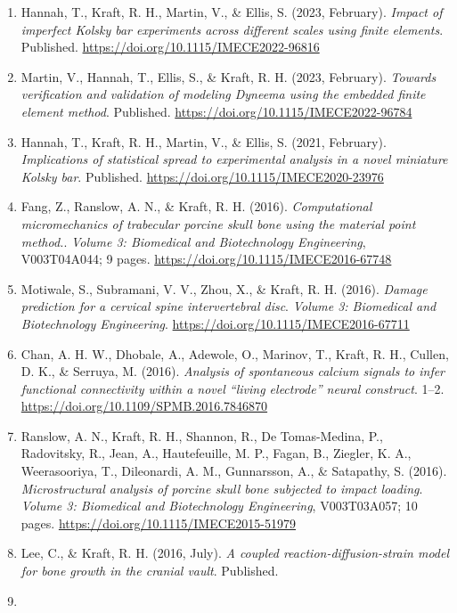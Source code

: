 \documentclass[
]{article}
\begin{document}
\begin{enumerate}
\def\labelenumi{\arabic{enumi}.}
\item
  Hannah, T., Kraft, R. H., Martin, V., \& Ellis, S. (2023, February).
  \emph{Impact of imperfect Kolsky bar experiments across different
  scales using finite elements}. Published.
  \url{https://doi.org/10.1115/IMECE2022-96816}
\item
  Martin, V., Hannah, T., Ellis, S., \& Kraft, R. H. (2023, February).
  \emph{Towards verification and validation of modeling Dyneema using
  the embedded finite element method}. Published.
  \url{https://doi.org/10.1115/IMECE2022-96784}
\item
  Hannah, T., Kraft, R. H., Martin, V., \& Ellis, S. (2021, February).
  \emph{Implications of statistical spread to experimental analysis in a
  novel miniature Kolsky bar}. Published.
  \url{https://doi.org/10.1115/IMECE2020-23976}
\item
  Fang, Z., Ranslow, A. N., \& Kraft, R. H. (2016). \emph{Computational
  micromechanics of trabecular porcine skull bone using the material
  point method.}. \emph{Volume 3: Biomedical and Biotechnology
  Engineering}, V003T04A044; 9 pages.
  \url{https://doi.org/10.1115/IMECE2016-67748}
\item
  Motiwale, S., Subramani, V. V., Zhou, X., \& Kraft, R. H. (2016).
  \emph{Damage prediction for a cervical spine intervertebral disc}.
  \emph{Volume 3: Biomedical and Biotechnology Engineering}.
  \url{https://doi.org/10.1115/IMECE2016-67711}
\item
  Chan, A. H. W., Dhobale, A., Adewole, O., Marinov, T., Kraft, R. H.,
  Cullen, D. K., \& Serruya, M. (2016). \emph{Analysis of spontaneous
  calcium signals to infer functional connectivity within a novel
  ``living electrode'' neural construct}. 1--2.
  \url{https://doi.org/10.1109/SPMB.2016.7846870}
\item
  Ranslow, A. N., Kraft, R. H., Shannon, R., De Tomas-Medina, P.,
  Radovitsky, R., Jean, A., Hautefeuille, M. P., Fagan, B., Ziegler, K.
  A., Weerasooriya, T., Dileonardi, A. M., Gunnarsson, A., \& Satapathy,
  S. (2016). \emph{Microstructural analysis of porcine skull bone
  subjected to impact loading}. \emph{Volume 3: Biomedical and
  Biotechnology Engineering}, V003T03A057; 10 pages.
  \url{https://doi.org/10.1115/IMECE2015-51979}
\item
  Lee, C., \& Kraft, R. H. (2016, July). \emph{A coupled
  reaction-diffusion-strain model for bone growth in the cranial vault}.
  Published.
\item

\end{enumerate}
\end{document}
